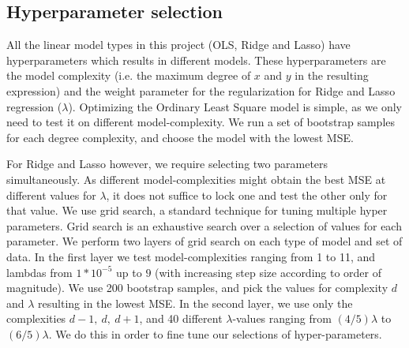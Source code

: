
\subsection{Hyperparameter selection}
All the linear model types in this project (OLS, Ridge and Lasso) have hyperparameters which results in different models. 
These hyperparameters are the model complexity (i.e. the maximum degree of $x$ and $y$ in the resulting expression) and the weight parameter for the regularization for Ridge and Lasso regression ($\lambda$). 
Optimizing the Ordinary Least Square model is simple, as we only need to test it on different model-complexity. 
We run a set of bootstrap samples for each degree complexity, and choose the model with the lowest MSE.

For Ridge and Lasso however, we require selecting two parameters simultaneously. As different model-complexities might obtain the best MSE at different values for $\lambda$, it does not suffice to lock one and test the other only for that value. 
We use grid search, a standard technique for tuning multiple hyper parameters. \citep[p. 302]{grid_search} 
Grid search is an exhaustive search over a selection of values for each parameter. 
We perform two layers of grid search on each type of model and set of data. 
In the first layer we test model-complexities ranging from 1 to 11, and lambdas from $1*10^{-5}$ up to $9$ (with increasing step size according to order of magnitude). 
We use 200 bootstrap samples, and pick the values for complexity $d$ and $\lambda$ resulting in the lowest MSE. 
In the second layer, we use only the complexities $d-1,\ d,\ d+1$, and 40 different $\lambda$-values ranging from $(4/5)\lambda$ to $(6/5)\lambda$. 
We do this in order to fine tune our selections of hyper-parameters.
\gaute{}